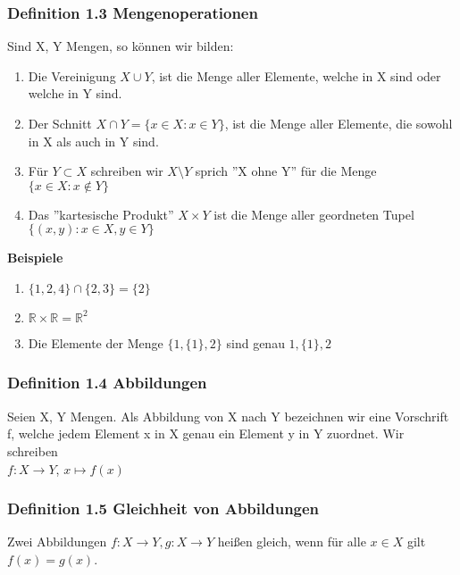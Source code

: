 \documentclass{report}
\newcommand{\R}{\mathbb{R}}
\theoremstyle{customrem}
\theoremstyle{customdef}
\begin{document}
\subsubsection{Definition 1.3 Mengenoperationen }
Sind X, Y Mengen, so können wir bilden:
\begin{enumerate}
\item{Die Vereinigung $X \cup Y$, ist die Menge aller Elemente, welche in X sind oder welche in Y sind.}
\item{Der Schnitt $X \cap Y = \{x \in X : x \in Y\}$, ist die Menge aller Elemente, die sowohl in X als auch in Y sind.}
\item{Für $Y \subset X$ schreiben wir $X \setminus Y$ sprich ''X ohne Y'' für die Menge $\{x \in X : x \not\in Y\}$}
\item{Das ''kartesische Produkt'' $X \times Y$ ist die Menge aller geordneten Tupel $\{(x, y) : x\in X, y\in Y\}$ }
\end{enumerate}
\textbf{Beispiele}
\begin{enumerate}
\item{$\{1, 2, 4\} \cap \{2, 3\} = \{2\}$}
\item{$\R \times \R = \R^2$}
\item{Die Elemente der Menge $\{1, \{1\}, 2\}$ sind genau $1, \{1\}, 2$ }
\end{enumerate}

\subsubsection{Definition 1.4 Abbildungen}
Seien X, Y Mengen. Als Abbildung von X nach Y bezeichnen wir eine Vorschrift f, welche jedem Element x in X genau ein Element y in Y zuordnet. Wir schreiben\\
$f : X \rightarrow Y$, $x \mapsto f(x)$

\subsubsection{Definition 1.5 Gleichheit von Abbildungen}
Zwei Abbildungen $f : X \rightarrow Y, g : X \rightarrow Y$ hei\ss{}en gleich, wenn für alle $x \in X$ gilt $f(x) = g(x)$.
\end{document}
